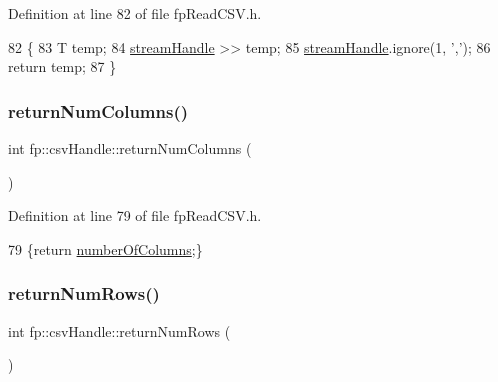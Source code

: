 Definition at line 82 of file fp\+Read\+C\+S\+V.\+h.


\begin{DoxyCode}
82                                             \{
83                     T temp;
84                     \hyperlink{classfp_1_1csvHandle_a42c4ad8f38a95c724dfa2b173991a524}{streamHandle} >> temp;
85                     \hyperlink{classfp_1_1csvHandle_a42c4ad8f38a95c724dfa2b173991a524}{streamHandle}.ignore(1, \textcolor{charliteral}{','});
86                     \textcolor{keywordflow}{return} temp;
87                 \}
\end{DoxyCode}
\mbox{\label{classfp_1_1csvHandle_a75e82e4e5b32941fc0a0a777f6ab6adf}} 
\subsubsection{\texorpdfstring{return\+Num\+Columns()}{returnNumColumns()}}
{\footnotesize\ttfamily int fp\+::csv\+Handle\+::return\+Num\+Columns (\begin{DoxyParamCaption}{ }\end{DoxyParamCaption})\hspace{0.3cm}{\ttfamily [inline]}}



Definition at line 79 of file fp\+Read\+C\+S\+V.\+h.


\begin{DoxyCode}
79 \{\textcolor{keywordflow}{return} \hyperlink{classfp_1_1csvHandle_ae3e5280846df348d0b1b86b78f2e3682}{numberOfColumns};\}
\end{DoxyCode}
\mbox{\label{classfp_1_1csvHandle_a580d222d5aa55e716860f514ce661237}} 
\subsubsection{\texorpdfstring{return\+Num\+Rows()}{returnNumRows()}}
{\footnotesize\ttfamily int fp\+::csv\+Handle\+::return\+Num\+Rows (\begin{DoxyParamCaption}{ }\end{DoxyParamCaption})\hspace{0.3cm}{\ttfamily [inline]}}




